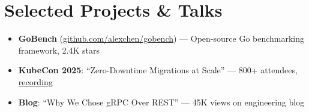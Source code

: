 \documentclass[10pt,a4paper]{article}
\begin{document}
\section{Selected Projects \& Talks}

\begin{itemize}[leftmargin=12pt,nosep,topsep=2pt]
    \item \textbf{GoBench} (\href{https://github.com/alexchen/gobench}{github.com/alexchen/gobench}) --- Open-source Go benchmarking framework, 2.4K stars
    \item \textbf{KubeCon 2025}: ``Zero-Downtime Migrations at Scale'' --- 800+ attendees, \href{https://youtube.com/watch?v=example}{recording}
    \item \textbf{Blog}: ``Why We Chose gRPC Over REST'' --- 45K views on engineering blog
\end{itemize}
\end{document}
